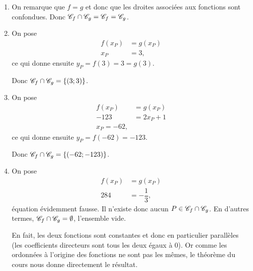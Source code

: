 {\begin{enumerate}
			Donc $\C_f \cap \C_g = \left\{ \left(-\dfrac65;\dfrac{32}5 \right) \right\}$.
		
		
		\item 
			On remarque que $f=g$ et donc que les droites associées aux fonctions sont confondues.			
			Donc $\mathcal{C}_f \cap \mathcal{C}_g = \mathcal{C}_f = \mathcal{C}_g$.
			
		\item
			On pose
				\begin{align*}
				f(x_P) &= g(x_P) \\
				x_P & = 3,
			\end{align*}
			ce qui donne ensuite $y_P = f(3) = 3 = g(3)$.
			
			Donc $\mathcal{C}_f \cap \mathcal{C}_g = \left\{ \left( 3; 3 \right) \right\}$.
			
			
		\item
			On pose
				\begin{align*}
				f(x_P) &= g(x_P) \\
				-123 & = 2x_P+1 \\
				x_P = -62,
			\end{align*}
			ce qui donne ensuite $y_P = f(-62) = -123$.
			
			Donc $\mathcal{C}_f \cap \mathcal{C}_g = \left\{ \left( -62; -123 \right) \right\}$.
			
			
		\item
			On pose
				\begin{align*}
				f(x_P) &= g(x_P) \\
				284 & = -\dfrac13,
			\end{align*}
			équation évidemment fausse.
			Il n'existe donc aucun $P \in \mathcal{C}_f \cap \mathcal{C}_g$. 
			En d'autres termes, $\mathcal{C}_f \cap \mathcal{C}_g = \emptyset$, l'ensemble vide.
			
			En fait, les deux fonctions sont constantes et donc en particulier parallèles (les coefficients directeurs sont tous les deux égaux à $0$).
			Or comme les ordonnées à l'origine des fonctions ne sont pas les mêmes, le théorème du cours nous donne directement le résultat.
	\end{enumerate}

}

